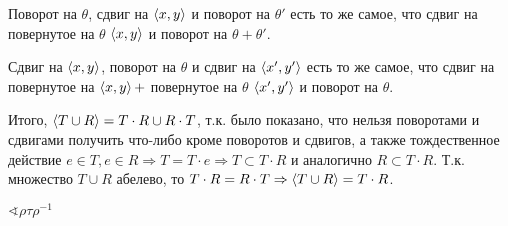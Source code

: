 \begin{solution}
    Поворот на \(\theta\), сдвиг на \(\ev{x, y}\) и поворот на \(\theta'\) есть то же самое, что сдвиг на повернутое на \(\theta\) \(\ev{x, y}\) и поворот на \(\theta + \theta'\).

    Сдвиг на \(\ev{x, y}\), поворот на \(\theta\) и сдвиг на \(\ev{x', y'}\) есть то же самое, что сдвиг на повернутое на \(\ev{x, y} +\) повернутое на \(\theta\) \(\ev{x', y'}\) и поворот на \(\theta\).

    Итого, \(\ev{T \cup R} = T \cdot R \cup R \cdot T\), т.к. было показано, что нельзя поворотами и сдвигами получить что-либо кроме поворотов и сдвигов, а также тождественное действие \(e \in T, e \in R \Rightarrow T = T \cdot e \Rightarrow T \subset T \cdot R\) и аналогично \(R \subset T \cdot R\). Т.к. множество \(T \cup R\) абелево, то \(T \cdot R = R \cdot T \Rightarrow \ev{T \cup R} = T \cdot R\).

    \(\sphericalangle \rho \tau \rho^{-1}\)


\end{solution}
